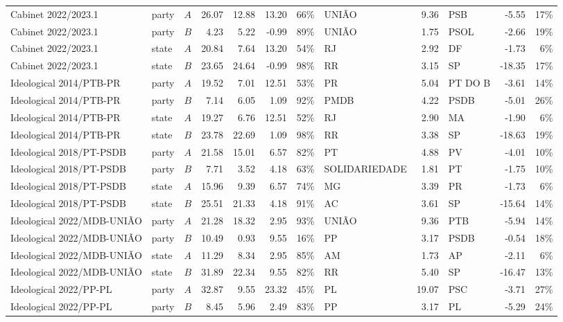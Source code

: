 \begin{landscape}
\begin{longtable}{L{4.3cm}llrrrrL{2.0cm}rL{2.0cm}rr}
Cabinet 2022/2023.1 & party & \(A\) & 26.07 & 12.88 & 13.20 & 66\% & UNIÃO & 9.36 & PSB & -5.55 & 17\% \\
Cabinet 2022/2023.1 & party & \(B\) & 4.23 & 5.22 & -0.99 & 89\% & UNIÃO & 1.75 & PSOL & -2.66 & 19\% \\
Cabinet 2022/2023.1 & state & \(A\) & 20.84 & 7.64 & 13.20 & 54\% & RJ & 2.92 & DF & -1.73 & 6\% \\
Cabinet 2022/2023.1 & state & \(B\) & 23.65 & 24.64 & -0.99 & 98\% & RR & 3.15 & SP & -18.35 & 17\% \\
Ideological 2014/PTB-PR & party & \(A\) & 19.52 & 7.01 & 12.51 & 53\% & PR & 5.04 & PT DO B & -3.61 & 14\% \\
Ideological 2014/PTB-PR & party & \(B\) & 7.14 & 6.05 & 1.09 & 92\% & PMDB & 4.22 & PSDB & -5.01 & 26\% \\
Ideological 2014/PTB-PR & state & \(A\) & 19.27 & 6.76 & 12.51 & 52\% & RJ & 2.90 & MA & -1.90 & 6\% \\
Ideological 2014/PTB-PR & state & \(B\) & 23.78 & 22.69 & 1.09 & 98\% & RR & 3.38 & SP & -18.63 & 19\% \\
Ideological 2018/PT-PSDB & party & \(A\) & 21.58 & 15.01 & 6.57 & 82\% & PT & 4.88 & PV & -4.01 & 10\% \\
Ideological 2018/PT-PSDB & party & \(B\) & 7.71 & 3.52 & 4.18 & 63\% & SOLIDARIEDADE & 1.81 & PT & -1.75 & 10\% \\
Ideological 2018/PT-PSDB & state & \(A\) & 15.96 & 9.39 & 6.57 & 74\% & MG & 3.39 & PR & -1.73 & 6\% \\
Ideological 2018/PT-PSDB & state & \(B\) & 25.51 & 21.33 & 4.18 & 91\% & AC & 3.61 & SP & -15.64 & 14\% \\
Ideological 2022/MDB-UNIÃO & party & \(A\) & 21.28 & 18.32 & 2.95 & 93\% & UNIÃO & 9.36 & PTB & -5.94 & 14\% \\
Ideological 2022/MDB-UNIÃO & party & \(B\) & 10.49 & 0.93 & 9.55 & 16\% & PP & 3.17 & PSDB & -0.54 & 18\% \\
Ideological 2022/MDB-UNIÃO & state & \(A\) & 11.29 & 8.34 & 2.95 & 85\% & AM & 1.73 & AP & -2.11 & 6\% \\
Ideological 2022/MDB-UNIÃO & state & \(B\) & 31.89 & 22.34 & 9.55 & 82\% & RR & 5.40 & SP & -16.47 & 13\% \\
Ideological 2022/PP-PL & party & \(A\) & 32.87 & 9.55 & 23.32 & 45\% & PL & 19.07 & PSC & -3.71 & 27\% \\
Ideological 2022/PP-PL & party & \(B\) & 8.45 & 5.96 & 2.49 & 83\% & PP & 3.17 & PL & -5.29 & 24\% \\

\end{longtable}
\end{landscape}
